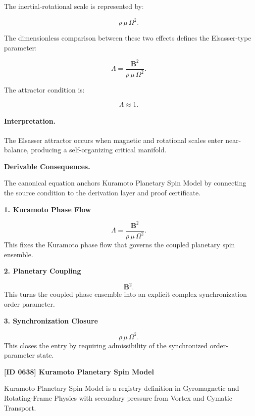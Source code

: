 The inertial-rotational scale is represented by:

\begin{equation}
\rho\,\mu\,\Omega^2 .
\end{equation}

The dimensionless comparison between these two effects defines the Elsasser-type parameter:

\begin{equation}
\boxed{
\Lambda
=
\frac{\mathbf{B}^2}
{\rho\,\mu\,\Omega^2}.
}
\end{equation}

The attractor condition is:

\begin{equation}
\Lambda \approx 1 .
\end{equation}

\paragraph{Interpretation.}
The Elsasser attractor occurs when magnetic and rotational scales enter near-balance, producing a self-organizing critical manifold.

\par\vspace{0.35em}
\noindent\textbf{Derivable Consequences.}\quad
\begingroup
\footnotesize
\raggedright
The canonical equation anchors Kuramoto Planetary Spin Model by connecting the source condition to the derivation layer and proof certificate.
\par\endgroup

\noindent\textbf{1. Kuramoto Phase Flow}\par
\[
\Lambda = \frac{\mathbf{B}^2} {\rho\,\mu\,\Omega^2}.
\]
\noindent This fixes the Kuramoto phase flow that governs the coupled planetary spin ensemble.\par
\noindent\textbf{2. Planetary Coupling}\par
\[
\mathbf{B}^2.
\]
\noindent This turns the coupled phase ensemble into an explicit complex synchronization order parameter.\par
\noindent\textbf{3. Synchronization Closure}\par
\[
\rho\,\mu\,\Omega^2.
\]
\noindent This closes the entry by requiring admissibility of the synchronized order-parameter state.\par

\clearpage
\noindent\textbf{[ID 0638] Kuramoto Planetary Spin Model}\par
\vspace{0.35em}
\begingroup\small
{}
Kuramoto Planetary Spin Model is a registry definition in Gyromagnetic and Rotating-Frame Physics with secondary pressure from Vortex and Cymatic Transport.

